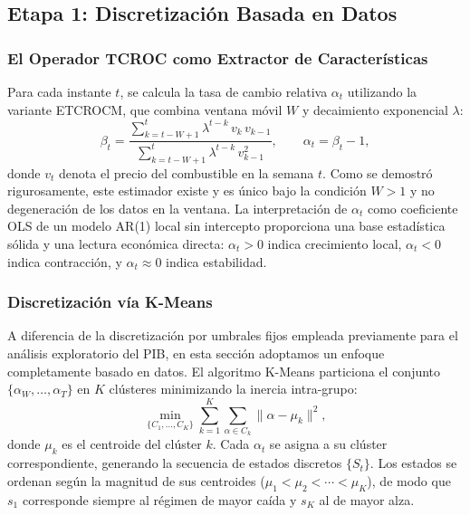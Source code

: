 \subsection{Etapa 1: Discretización Basada en Datos}
\label{subsec:etapa1_discretizacion}

\subsubsection{El Operador TCROC como Extractor de Características}

Para cada instante $t$, se calcula la tasa de cambio relativa
$\alpha_t$ utilizando la variante ETCROCM, que combina ventana
móvil $W$ y decaimiento exponencial $\lambda$:
\begin{equation}
    \beta_t = \frac{\displaystyle\sum_{k=t-W+1}^{t} \lambda^{t-k}\,
    v_k\, v_{k-1}}{\displaystyle\sum_{k=t-W+1}^{t} \lambda^{t-k}\,
    v_{k-1}^2}, \qquad \alpha_t = \beta_t - 1,
    \label{eq:alpha_t_combustibles}
\end{equation}
donde $v_t$ denota el precio del combustible en la semana $t$. Como
se demostró rigurosamente, este estimador existe y es único
bajo la condición $W > 1$ y no degeneración de los datos en la
ventana. La interpretación de $\alpha_t$ como coeficiente OLS de un
modelo AR(1) local sin intercepto proporciona una base estadística
sólida y una lectura económica directa: $\alpha_t > 0$ indica
crecimiento local, $\alpha_t < 0$ indica contracción, y $\alpha_t \approx 0$ indica estabilidad.

\subsubsection{Discretización vía K-Means}

A diferencia de la discretización por umbrales fijos empleada
previamente para el análisis
exploratorio del PIB, en esta sección adoptamos un enfoque
completamente basado en datos.  El algoritmo K-Means particiona el
conjunto $\{\alpha_W, \ldots, \alpha_T\}$ en $K$ clústeres
minimizando la inercia intra-grupo:
\begin{equation}
    \min_{\{C_1, \ldots, C_K\}} \sum_{k=1}^{K}
    \sum_{\alpha \in C_k} \|\alpha - \mu_k\|^2,
    \label{eq:kmeans_objetivo}
\end{equation}
donde $\mu_k$ es el centroide del clúster $k$.  Cada $\alpha_t$ se
asigna a su clúster correspondiente, generando la secuencia de
estados discretos $\{S_t\}$.  Los estados se ordenan según la
magnitud de sus centroides ($\mu_1 < \mu_2 < \cdots < \mu_K$), de
modo que $s_1$ corresponde siempre al régimen de mayor caída y $s_K$
al de mayor alza.

